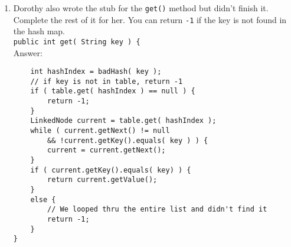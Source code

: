\documentclass[11pt]{article}
\newenvironment{answer}{\large\lstset{basicstyle=\large\ttfamily}\color{white} \small{Answer:}}{}
\newenvironment{answer}{\large\lstset{basicstyle=\large\ttfamily}\color{red} \small{Answer:}}{}
\begin{document}
\begin{enumerate}
\item Dorothy also wrote the stub for the {\tt get()} method but didn't finish it. Complete the rest of it for her. You can return {\tt -1} if the key is not found in the hash map. \\
{\tt public int get( String key ) \{ } \\
\begin{answer} 
	\begin{lstlisting}
	int hashIndex = badHash( key );
	// if key is not in table, return -1
	if ( table.get( hashIndex ) == null ) {
		return -1;
	}
	LinkedNode current = table.get( hashIndex );
	while ( current.getNext() != null 
		&& !current.getKey().equals( key ) ) {
		current = current.getNext();
	}
	if ( current.getKey().equals( key) ) {
		return current.getValue();
	}
	else {
		// We looped thru the entire list and didn't find it
		return -1;
	}
}
	\end{lstlisting}
\end{answer}



\end{enumerate}
\end{document}
